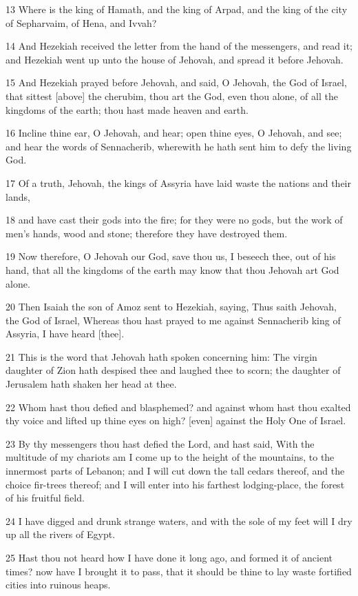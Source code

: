 \par 13 Where is the king of Hamath, and the king of Arpad, and the king of the city of Sepharvaim, of Hena, and Ivvah?
\par 14 And Hezekiah received the letter from the hand of the messengers, and read it; and Hezekiah went up unto the house of Jehovah, and spread it before Jehovah.
\par 15 And Hezekiah prayed before Jehovah, and said, O Jehovah, the God of Israel, that sittest [above] the cherubim, thou art the God, even thou alone, of all the kingdoms of the earth; thou hast made heaven and earth.
\par 16 Incline thine ear, O Jehovah, and hear; open thine eyes, O Jehovah, and see; and hear the words of Sennacherib, wherewith he hath sent him to defy the living God.
\par 17 Of a truth, Jehovah, the kings of Assyria have laid waste the nations and their lands,
\par 18 and have cast their gods into the fire; for they were no gods, but the work of men's hands, wood and stone; therefore they have destroyed them.
\par 19 Now therefore, O Jehovah our God, save thou us, I beseech thee, out of his hand, that all the kingdoms of the earth may know that thou Jehovah art God alone.
\par 20 Then Isaiah the son of Amoz sent to Hezekiah, saying, Thus saith Jehovah, the God of Israel, Whereas thou hast prayed to me against Sennacherib king of Assyria, I have heard [thee].
\par 21 This is the word that Jehovah hath spoken concerning him: The virgin daughter of Zion hath despised thee and laughed thee to scorn; the daughter of Jerusalem hath shaken her head at thee.
\par 22 Whom hast thou defied and blasphemed? and against whom hast thou exalted thy voice and lifted up thine eyes on high? [even] against the Holy One of Israel.
\par 23 By thy messengers thou hast defied the Lord, and hast said, With the multitude of my chariots am I come up to the height of the mountains, to the innermost parts of Lebanon; and I will cut down the tall cedars thereof, and the choice fir-trees thereof; and I will enter into his farthest lodging-place, the forest of his fruitful field.
\par 24 I have digged and drunk strange waters, and with the sole of my feet will I dry up all the rivers of Egypt.
\par 25 Hast thou not heard how I have done it long ago, and formed it of ancient times? now have I brought it to pass, that it should be thine to lay waste fortified cities into ruinous heaps.
